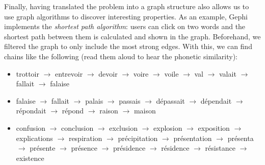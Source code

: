 Finally, having translated the problem into a graph structure also allows us to use graph algorithms to discover interesting properties. As an example, Gephi implements the \textit{shortest path algorithm}: users can click on two words and the shortest path between them is calculated and shown in the graph. Beforehand, we filtered the graph to only include the most strong edges. With this, we can find chains like the following (read them aloud to hear the phonetic similarity):
\begin{itemize}
    \item trottoir $\rightarrow$ entrevoir $\rightarrow$ devoir $\rightarrow$ voire $\rightarrow$ voile $\rightarrow$ val $\rightarrow$ valait $\rightarrow$ fallait $\rightarrow$ falaise
    \item falaise $\rightarrow$ fallait $\rightarrow$ palais $\rightarrow$ passais $\rightarrow$ dépassait $\rightarrow$ dépendait $\rightarrow$ répondait $\rightarrow$ répond $\rightarrow$ raison $\rightarrow$ maison
    \item confusion $\rightarrow$ conclusion $\rightarrow$ exclusion $\rightarrow$ explosion $\rightarrow$ exposition $\rightarrow$ explications $\rightarrow$ respiration $\rightarrow$ précipitation $\rightarrow$ présentation $\rightarrow$ présenta $\rightarrow$ présente $\rightarrow$ présence $\rightarrow$ présidence $\rightarrow$ résidence $\rightarrow$ résistance $\rightarrow$ existence
\end{itemize}

